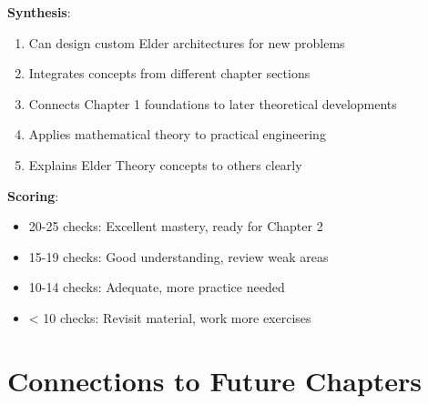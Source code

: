 \begin{tcolorbox}[colback=green!5,colframe=green!50!black,title=Chapter 1 Mastery Checklist]
\textbf{Synthesis}:
\begin{enumerate}[label=$\square$]
\item Can design custom Elder architectures for new problems
\item Integrates concepts from different chapter sections
\item Connects Chapter 1 foundations to later theoretical developments
\item Applies mathematical theory to practical engineering
\item Explains Elder Theory concepts to others clearly
\end{enumerate}

\textbf{Scoring}: 
\begin{itemize}
\item 20-25 checks: Excellent mastery, ready for Chapter 2
\item 15-19 checks: Good understanding, review weak areas
\item 10-14 checks: Adequate, more practice needed
\item < 10 checks: Revisit material, work more exercises
\end{itemize}

\end{tcolorbox}

\section{Connections to Future Chapters}

